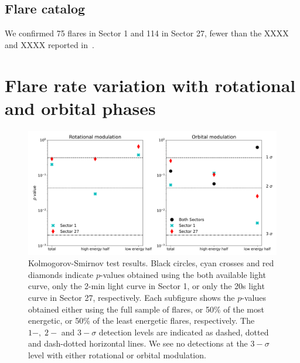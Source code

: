 \documentclass[fleqn,usenatbib,letters]{mnras}%
\begin{document}
\subsection{Flare catalog}
\label{sec:flarecatalog}
We confirmed 75 flares in Sector 1 and 114 in Sector 27, fewer than the XXXX and XXXX reported in~\citet{martioli2021}.

\section{Flare rate variation with rotational and orbital phases}
\label{sec:phases}
\begin{figure}
\includegraphics[width=\hsize]{figures/2021_06_09_AUMic_KStests_meta.png} 
\caption{Kolmogorov-Smirnov test results. Black circles, cyan crosses and red diamonds indicate $p$-values obtained using the both available light curve, only the 2-min light curve in Sector 1, or only the 20s light curve in Sector 27, respectively. Each subfigure shows the $p$-values obtained either using the full sample of flares, or 50\% of the most energetic, or 50\% of the least energetic flares, respectively. The $1-,\;2-$ and $3-\sigma$ detection levels are indicated as dashed, dotted and dash-dotted horizontal lines. We see no detections at the $3-\sigma$ level with either rotational or orbital modulation.}
\label{fig:kstests}
\end{figure}
\end{document}
